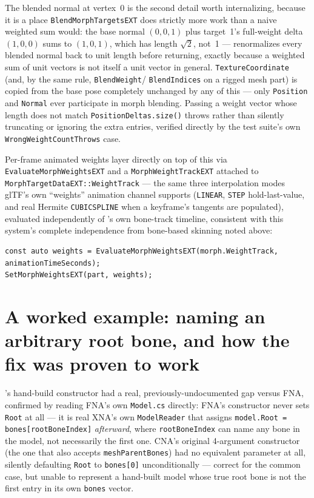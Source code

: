 The blended normal at vertex~0 is the second detail worth internalizing, because it is a place
\texttt{BlendMorphTargetsEXT} does strictly more work than a naive weighted sum would: the base
normal $(0,0,1)$ plus target~1's full-weight delta $(1,0,0)$ sums to $(1,0,1)$, which has length
$\sqrt{2}$, not~1 ---  renormalizes every blended normal back to
unit length before returning, exactly because a weighted sum of unit vectors is not itself a
unit vector in general. \texttt{TextureCoordinate} (and, by the same rule, \texttt{BlendWeight}/
\texttt{BlendIndices} on a rigged mesh part) is copied from the base pose completely unchanged
by any of this --- only \texttt{Position} and \texttt{Normal} ever participate in morph blending.
Passing a weight vector whose length does not match \texttt{PositionDeltas.size()} throws rather
than silently truncating or ignoring the extra entries, verified directly by the test suite's
own \texttt{WrongWeightCountThrows} case.

Per-frame animated weights layer directly on top of this via \texttt{EvaluateMorphWeightsEXT}
and a \texttt{MorphWeightTrackEXT} attached to \texttt{MorphTargetDataEXT::WeightTrack} --- the
same three interpolation modes glTF's own ``weights'' animation channel supports (\texttt{LINEAR},
\texttt{STEP} hold-last-value, and real Hermite \texttt{CUBICSPLINE} when a keyframe's tangents
are populated), evaluated independently of 's own bone-track timeline,
consistent with this system's complete independence from bone-based skinning noted above:

\begin{lstlisting}
const auto weights = EvaluateMorphWeightsEXT(morph.WeightTrack, animationTimeSeconds);
SetMorphWeightsEXT(part, weights);
\end{lstlisting}

\section[A worked example: naming an arbitrary root bone]{A worked example: naming an
arbitrary root bone, and how the fix was proven to work}

's hand-build constructor had a real, previously-undocumented gap versus FNA,
confirmed by reading FNA's own \texttt{Model.cs} directly: FNA's constructor never sets
\texttt{Root} at all --- it is real XNA's own \texttt{ModelReader} that assigns
\texttt{model.Root = bones[rootBoneIndex]} \emph{afterward}, where \texttt{rootBoneIndex} can
name any bone in the model, not necessarily the first one. CNA's original 4-argument
constructor (the one that also accepts \texttt{meshParentBones}) had no equivalent parameter at
all, silently defaulting \texttt{Root} to \texttt{bones[0]} unconditionally --- correct for the
common case, but unable to represent a hand-built model whose true root bone is not the first
entry in its own \texttt{bones} vector.

